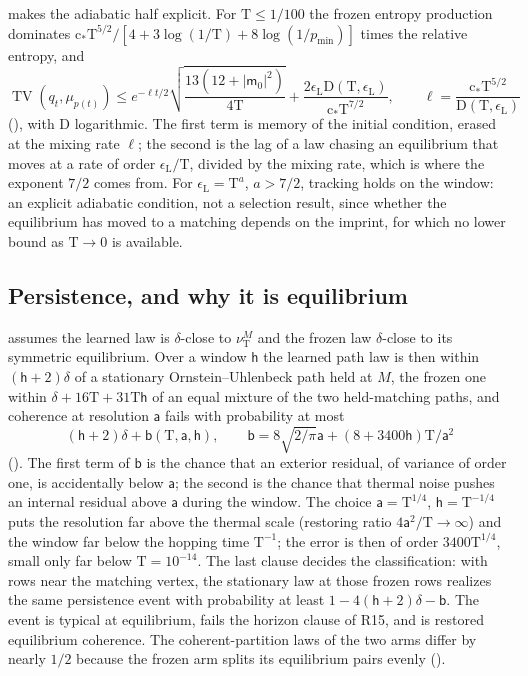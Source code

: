  makes the adiabatic half explicit. For $\mathrm T\le1/100$ the frozen
entropy production dominates $\mathrm c_*\mathrm T^{5/2}/[4+3\log(1/\mathrm T)+8\log(1/p_{\min})]$
times the relative entropy, and
\[
\operatorname{TV}(q_t,\mu_{p(t)})
\le e^{-\ell t/2}\sqrt{\frac{13(12+|\mathsf m_0|^2)}{4\mathrm T}}
+\frac{2\epsilon_{\mathrm L}\mathrm D(\mathrm T,\epsilon_{\mathrm L})}{\mathrm c_*\mathrm T^{7/2}},
\qquad
\ell=\frac{\mathrm c_*\mathrm T^{5/2}}{\mathrm D(\mathrm T,\epsilon_{\mathrm L})}
\]
(), with $\mathrm D$ logarithmic. The first term is memory of the
initial condition, erased at the mixing rate $\ell$; the second is the lag of a law chasing an equilibrium
that moves at a rate of order $\epsilon_{\mathrm L}/\mathrm T$, divided by the mixing rate, which is where
the exponent $7/2$ comes from. For $\epsilon_{\mathrm L}=\mathrm T^a$, $a>7/2$, tracking holds on the
window: an explicit adiabatic condition, not a selection result, since whether the equilibrium has moved
to a matching depends on the imprint, for which no lower bound as $\mathrm T\to0$ is available.

\subsection{Persistence, and why it is equilibrium}

 assumes the learned law is $\delta$-close to $\nu^M_{\mathrm T}$
and the frozen law $\delta$-close to its symmetric equilibrium. Over a window $\mathsf h$ the learned path
law is then within $(\mathsf h+2)\delta$ of a stationary Ornstein--Uhlenbeck path held at $M$, the frozen
one within $\delta+16\mathrm T+31\mathrm T\mathsf h$ of an equal mixture of the two held-matching paths,
and coherence at resolution $\mathsf a$ fails with probability at most
\[
(\mathsf h+2)\delta+\mathsf b(\mathrm T,\mathsf a,\mathsf h),
\qquad
\mathsf b=8\sqrt{2/\pi}\mathsf a+(8+3400\mathsf h)\mathrm T/\mathsf a^2
\]
(). The first term of $\mathsf b$ is the chance that an
exterior residual, of variance of order one, is accidentally below $\mathsf a$; the second is the chance
that thermal noise pushes an internal residual above $\mathsf a$ during the window. The choice
$\mathsf a=\mathrm T^{1/4}$, $\mathsf h=\mathrm T^{-1/4}$ puts the resolution far above the thermal scale
(restoring ratio $4\mathsf a^2/\mathrm T\to\infty$) and the window far below the hopping time
$\mathrm T^{-1}$; the error is then of order $3400\mathrm T^{1/4}$, small only far below
$\mathrm T=10^{-14}$. The last clause decides the classification: with rows near the matching vertex, the
stationary law at those frozen rows realizes the same persistence event with probability at least
$1-4(\mathsf h+2)\delta-\mathsf b$. The event is typical at equilibrium, fails the horizon clause of R15,
and is restored equilibrium coherence. The coherent-partition laws of the two arms differ by nearly $1/2$
because the frozen arm splits its equilibrium pairs evenly ().

